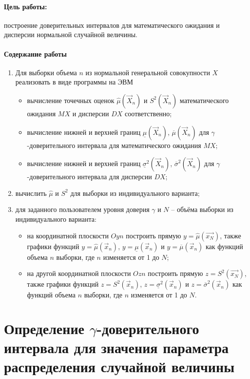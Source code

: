 \documentclass[a4paper,oneside,12pt]{extreport}
\theoremstyle{indented}
\begin{document}
\paragraph{Цель работы:} построение доверительных интервалов для математического ожидания и дисперсии нормальной случайной величины.

\paragraph{Содержание работы}

\begin{enumerate}
	\item Для выборки объема $n$ из нормальной генеральной совокупности $X$ реализовать в виде программы на ЭВМ
	\begin{itemize}
		\item вычисление точечных оценок $\hat\mu(\vec X_n)$ и $S^2(\vec X_n)$ математического ожидания $MX$ и дисперсии $DX$ соответственно;
		\item вычисление нижней и верхней границ $\underline\mu(\vec X_n)$, $\overline\mu(\vec X_n)$ для $\gamma$-доверительного интервала для математического ожидания $MX$;
		\item вычисление нижней и верхней границ $\underline\sigma^2(\vec X_n)$, $\overline\sigma^2(\vec X_n)$ для $\gamma$-доверительного интервала для дисперсии $DX$;
	\end{itemize}
	\item вычислить $\hat\mu$ и $S^2$ для выборки из индивидуального варианта;
	\item для заданного пользователем уровня доверия $\gamma$ и $N$ – объёма выборки из индивидуального варианта:
	\begin{itemize}
		\item на координатной плоскости $Oyn$ построить прямую $y = \hat\mu(\vec{x_N})$, также графики функций $y = \hat\mu(\vec x_n)$, $y = \underline\mu(\vec x_n)$ и $y = \overline\mu(\vec x_n)$ как функций объема $n$ выборки, где $n$ изменяется от 1 до $N$;
		\item на другой координатной плоскости $Ozn$ построить прямую $z = S^2(\vec{x_N})$, также графики функций $z = S^2(\vec x_n)$, $z = \underline\sigma^2(\vec x_n)$ и $z = \overline\sigma^2(\vec x_n)$ как функций объема $n$ выборки, где $n$ изменяется от 1 до $N$.
	\end{itemize}
\end{enumerate}

\pagebreak
\section{Определение $\gamma$-доверительного интервала для значения параметра распределения случайной величины}
\end{document}
